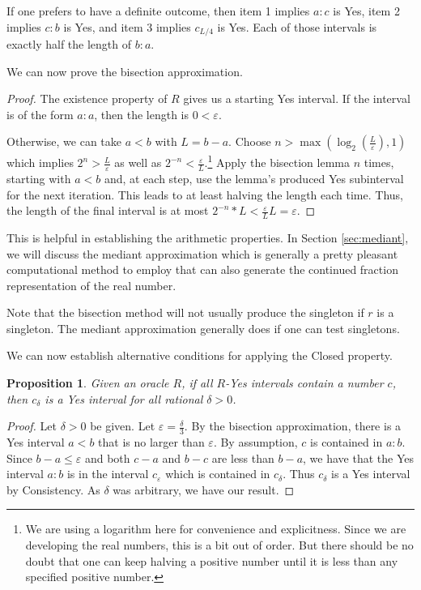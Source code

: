 \documentclass[12pt]{article}
\newtheorem{proposition}{Proposition}[subsection]
\begin{document}
If one prefers to have a definite outcome, then item 1 implies $a:c$ is Yes, item 2 implies $c:b$ is Yes, and item 3 implies $c_{L/4}$ is Yes. Each of those intervals is exactly half the length of $b:a$.

We can now prove the bisection approximation. 

\begin{proof}
    The existence property of $R$ gives us a starting Yes interval. If the interval is of the form $a:a$, then the length is $0 < \varepsilon$.
    
    Otherwise, we can take $a \lt b$ with $L = b-a$. Choose $n > \max(\log_2 (\frac{L}{\varepsilon}), 1)$ which implies $2^n > \frac{L}{\varepsilon}$ as well as $2^{-n} < \frac{\varepsilon}{L}$.\footnote{We are using a logarithm here for convenience and explicitness. Since we are developing the real numbers, this is a bit out of order. But there should be no doubt that one can keep halving a positive number until it is less than any specified positive number.} Apply the bisection lemma $n$ times, starting with $a \lt b$ and, at each step, use the lemma's produced Yes subinterval for the next iteration. This leads to at least halving the length each time. Thus, the length of the final interval is at most $2^{-n} * L < \frac{\varepsilon}{L} L = \varepsilon$.

\end{proof}

This is helpful in establishing the arithmetic properties. In Section \ref{sec:mediant}, we will discuss the mediant approximation which is generally a pretty pleasant computational method to employ that can also generate the continued fraction representation of the real number. 

Note that the bisection method will not usually produce the singleton if $r$ is a singleton. The mediant approximation generally does if one can test singletons. 


We can now establish alternative conditions for applying the Closed property. 

\begin{proposition}
    Given an oracle $R$, if all $R$-Yes intervals contain a number $c$, then $c_{\delta}$ is a Yes interval for all rational $\delta > 0$.
\end{proposition}

\begin{proof}
    Let $\delta > 0$ be given. Let $\varepsilon = \frac{\delta}{3}$. By the bisection approximation, there is a Yes interval $a\lt b$ that is no larger than $\varepsilon$. By assumption, $c$ is contained in $a:b$. Since $b-a \leq \varepsilon$ and both $c-a$ and $b-c$ are less than $b-a$, we have that the Yes interval $a:b$ is in the interval $c_{\varepsilon}$ which is contained in $c_{\delta}$. Thus $c_{\delta}$ is a Yes interval by Consistency. As $\delta$ was arbitrary, we have our result. 
\end{proof}
\end{document}

